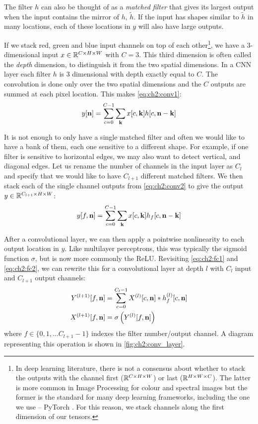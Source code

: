 The filter $h$ can also be thought of as a \emph{matched filter} 
that gives its largest output when the input contains the mirror of $h$, $\tilde{h}$. If the input has
shapes similar to $\tilde{h}$ in many locations, each of these locations in $y$ will
also have large outputs. 

If we stack red, green and blue input channels on top of each other\footnote{In deep 
learning literature, there is not a consensus about whether to stack the outputs
with the channel first ($\reals[C\x H\x W]$) or last ($\reals[H\x W\x C]$). The
latter is more common in Image Processing for colour and spectral images but
the former is the standard for many deep learning frameworks, including the one
we use -- PyTorch \cite{paszke_automatic_2017}. For this reason, we stack
channels along the first dimension of our tensors.}, we have a 
3-dimensional input $x \in \reals[C\x H\x W]$ with $C=3$.
This third dimension is often called the \emph{depth} dimension, to distinguish
it from the two spatial dimensions. In a CNN layer each filter $h$ is 3
dimensional with depth exactly equal to $C$. The convolution is
done only over the two spatial dimensions 
and the $C$ outputs are summed at each pixel location. This makes
\eqref{eq:ch2:conv1}:
\begin{equation}
  y[\nn] = \sum_{c=0}^{C-1} \sum_{\mathbf{k}} x[c, \mathbf{k}]h[c, \nn-\mathbf{k}]
  \label{eq:ch2:conv2}
\end{equation}

It is not enough to only have a single matched filter and often we would like to
have a bank of them, each one sensitive to a different shape. For example, if
one filter is sensitive to horizontal edges, we may also want to detect vertical, and
diagonal edges. Let us rename the number of channels in the input layer as
$C_{l}$ and specify that we would like to have $C_{l+1}$ different matched
filters. We then stack each of the single channel outputs from
\eqref{eq:ch2:conv2} to give the output $y \in \reals[C_{l+1} \x H\x W]$: 
%
\begin{equation}
  y[f, \nn] = \sum_{c=0}^{C-1} \sum_{\mathbf{k}} x[c, \mathbf{k}]h_f[c, \nn-\mathbf{k}]
  \label{eq:ch2:conv3}
\end{equation}

After a convolutional layer, we can then apply a pointwise nonlinearity to
each output location in $y$. Like multilayer perceptrons, this was typically the
sigmoid function $\sigma$, but is now more commonly the ReLU. Revisiting
\eqref{eq:ch2:fc1} and
\eqref{eq:ch2:fc2}, we can rewrite this for a convolutional layer at depth $l$
with $C_l$ input and $C_{l+1}$ output channels:
\begin{align}
  Y^{(l+1)}[f, \nn] &= \sum_{c=0}^{C_l-1} X^{(l)}[c, \nn] \conv h^{(l)}_f[c, \nn] 
    \label{eq:ch2:conv4}\\
    X^{(l+1)}[f, \nn] &= \sigma\left(Y^{(l)}[f, \nn]\right) \label{eq:ch2:conv4a}
\end{align}
where $f \in \{0, 1,\ldots C_{l+1}-1\}$ indexes the filter number/output channel. A diagram
representing this operation is shown in \autoref{fig:ch2:conv_layer}.

